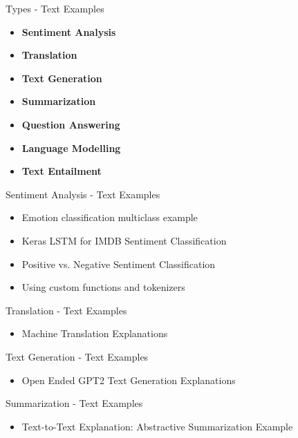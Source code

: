 \documentclass[aspectratio=169]{beamer}
\begin{document}
\begin{frame}{Types - Text Examples}
        \begin{itemize}
        \item \textbf{Sentiment Analysis}
        \item \textbf{Translation}
        \item \textbf{Text Generation}
        \item \textbf{Summarization}
        \item \textbf{Question Answering}
        \item \textbf{Language Modelling}
        \item \textbf{Text Entailment}
    \end{itemize}
\end{frame}

\begin{frame}{Sentiment Analysis - Text Examples}
    \begin{itemize}
        \item Emotion classification multiclass example
        \item Keras LSTM for IMDB Sentiment Classification
        \item Positive vs. Negative Sentiment Classification
        \item Using custom functions and tokenizers
    \end{itemize}   
\end{frame}

\begin{frame}{Translation - Text Examples}
    \begin{itemize}
        \item Machine Translation Explanations
    \end{itemize}   
\end{frame}

\begin{frame}{Text Generation - Text Examples}
    \begin{itemize}
        \item Open Ended GPT2 Text Generation Explanations
    \end{itemize}   
\end{frame}

\begin{frame}{Summarization - Text Examples}
    \begin{itemize}
        \item Text-to-Text Explanation: Abstractive Summarization Example
    \end{itemize}   
\end{frame}
\end{document}

